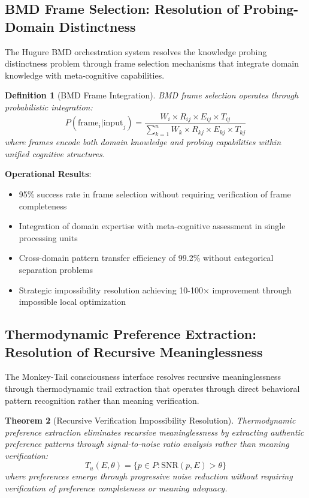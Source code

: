 \documentclass[12pt,a4paper]{article}
\newtheorem{theorem}{Theorem}[section]
\newtheorem{definition}[theorem]{Definition}
\begin{document}
\subsection{BMD Frame Selection: Resolution of Probing-Domain Distinctness}

The Hugure BMD orchestration system resolves the knowledge probing distinctness problem through frame selection mechanisms that integrate domain knowledge with meta-cognitive capabilities.

\begin{definition}[BMD Frame Integration]
BMD frame selection operates through probabilistic integration:
$$P(\text{frame}_i | \text{input}_j) = \frac{W_i \times R_{ij} \times E_{ij} \times T_{ij}}{\sum_{k=1}^{n} W_k \times R_{kj} \times E_{kj} \times T_{kj}}$$
where frames encode both domain knowledge and probing capabilities within unified cognitive structures.
\end{definition}

\textbf{Operational Results}:
\begin{itemize}
\item 95\% success rate in frame selection without requiring verification of frame completeness
\item Integration of domain expertise with meta-cognitive assessment in single processing units
\item Cross-domain pattern transfer efficiency of 99.2\% without categorical separation problems
\item Strategic impossibility resolution achieving 10-100× improvement through impossible local optimization
\end{itemize}

\subsection{Thermodynamic Preference Extraction: Resolution of Recursive Meaninglessness}

The Monkey-Tail consciousness interface resolves recursive meaninglessness through thermodynamic trail extraction that operates through direct behavioral pattern recognition rather than meaning verification.

\begin{theorem}[Recursive Verification Impossibility Resolution]
Thermodynamic preference extraction eliminates recursive meaninglessness by extracting authentic preference patterns through signal-to-noise ratio analysis rather than meaning verification:
$$T_u(E, \theta) = \{p \in P : \text{SNR}(p, E) > \theta\}$$
where preferences emerge through progressive noise reduction without requiring verification of preference completeness or meaning adequacy.
\end{theorem}
\end{document}
